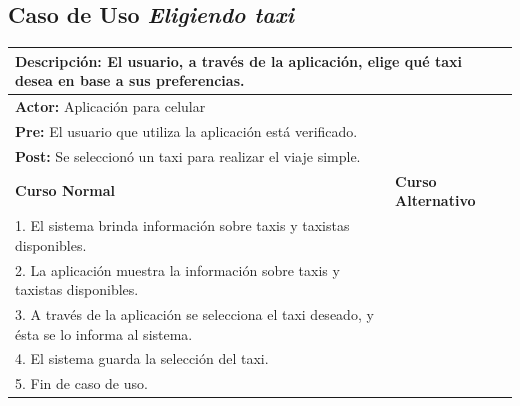 \documentclass[a4paper]{article}
\begin{document}
\subsection{Caso de Uso \textit{Eligiendo taxi}}
\begin{center}
\begin{tabular}{|p{10cm} | p{6cm}|}
\hline
\multicolumn{2}{|p{16cm}|}{\textbf{Descripci\'on:} El usuario, a trav\'es de la aplicaci\'on, elige qu\'e taxi desea en base a sus preferencias.} \\
\hline
\multicolumn{2}{|p{15cm}|}{\textbf{Actor:} Aplicaci\'on para celular} \\
\hline
\multicolumn{2}{|p{15cm}|}{\textbf{Pre:} El usuario que utiliza la aplicaci\'on est\'a verificado.} \\
\hline
\multicolumn{2}{|p{15cm}|}{\textbf{Post:} Se seleccion\'o un taxi para realizar el viaje simple.}\\
\hline
\textbf{Curso Normal}  & \textbf{Curso Alternativo} \\ \hline
1. El sistema brinda informaci\'on sobre taxis y taxistas disponibles.  & \\ \hline
2. La aplicaci\'on muestra la informaci\'on sobre taxis y taxistas disponibles. & \\ \hline
3. A trav\'es de la aplicaci\'on se selecciona el taxi deseado, y \'esta se lo informa al sistema. & \\ \hline
4. El sistema guarda la selecci\'on del taxi. & \\ \hline
5. Fin de caso de uso. & \\ \hline
\end{tabular}
\end{center}
\end{document}
